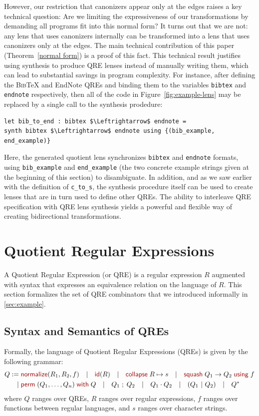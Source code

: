 \documentclass[acmsmall,review,anonymous]{acmart}
\newcommand{\kw}[1]{\textcolor{dkred}{\ensuremath{\mathsf{#1}}}}
\newcommand{\collapse}[2]{\ensuremath{\kw{collapse} \; #1 \mapsto #2}}
\newcommand{\squash}[3]{\ensuremath{\kw{squash} \; #1 \rightarrow #2\; \kw{using} \; #3}}
\newcommand{\perm}[2]{\ensuremath{\kw{perm}\; (#1)\; \kw{with}\; #2}}
\newcommand{\normalize}[3]{\ensuremath{\kw{normalize}(#1, #2, #3)}}
\newcommand{\sep}{\ensuremath{\ | \ }}
\newcommand{\bibtex}{\textsc{Bib}\TeX{}}
\newcommand{\semicolon}{\ensuremath{\; ; \;}}
\newcommand{\id}{\ensuremath{\kw{id}}}
\newcommand{\cd}[1]{\lstinline[backgroundcolor=\color{white}]$#1$}
\begin{document}
However, our restriction that canonizers appear only at the edges
raises a key technical question: Are we limiting the expressiveness of
our transformations by demanding all programs fit into this normal
form?  It turns out that we are not: any lens that uses canonizers
internally can be transformed into a lens that uses canonizers only at
the edges. The main technical contribution of this paper
(Theorem~\ref{normal form})
is a proof of this fact.
This technical result justifies 
using synthesis to produce QRE lenses instead of manually writing
them,
which can lead to substantial savings in program complexity.
For instance, after defining the \bibtex{} and EndNote QREs and
binding them to the variables \cd{bibtex} and \cd{endnote} respectively, then
all of the code in Figure~\ref{fig:example-lens} may be replaced by a single call
to the synthesis prodedure:
\begin{lstlisting}
let bib_to_end : bibtex $\Leftrightarrow$ endnote =
synth bibtex $\Leftrightarrow$ endnote using {(bib_example, end_example)}
\end{lstlisting}
\noindent 
Here, the generated quotient lens synchronizes \cd{bibtex} and
\cd{endnote} formats, using \cd{bib_example} and \cd{end_example} (the two
concrete example strings given at the beginning of this section) to
disambiguate. In addition, and as we saw earlier with the definition of
\cd{c_to_s}, the synthesis procedure itself can be used to create lenses that
are in turn used to define other QREs.  The ability to interleave QRE
specification with QRE lens synthesis yields a powerful and flexible way of
creating bidirectional transformations.

\section{Quotient Regular Expressions}
\label{QRE}
A Quotient Regular Expression (or QRE) is a regular expression $R$ augmented
with syntax that expresses an equivalence relation on the language of $R$. This
section formalizes the set of QRE combinators that we introduced informally
in \cref{sec:example}.

\subsection{Syntax and Semantics of QREs}
Formally, the language of Quotient Regular Expressions (QREs) is given by the
following grammar:
\newcommand{\bsep}{\ \ \sep{} \ \ }
\begin{align*}
Q := \; & \normalize{R_1}{R_2}{f} \bsep{} \id(R) \bsep \collapse{R}{s} \bsep \squash{Q_1}{Q_2}{f} \\
 | \; & \perm{Q_1, \ldots, Q_n}{Q} \bsep Q_1 \semicolon Q_2 \bsep Q_1 \cdot Q_2 \bsep (Q_1
\sep Q_2) \bsep Q^*
\end{align*}
where $Q$ ranges over QREs, 
$R$ ranges over regular expressions, 
$f$ ranges over functions between regular languages, and 
$s$ ranges over character strings.
\end{document}
